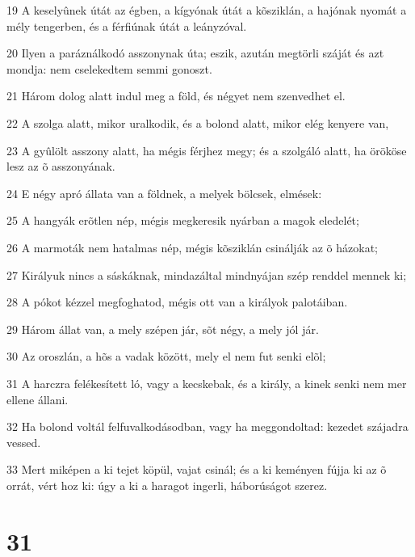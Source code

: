 \par 19 A keselyûnek útát az égben, a kígyónak útát a kõsziklán, a hajónak nyomát a mély tengerben, és a férfiúnak útát a leányzóval.
\par 20 Ilyen a paráználkodó asszonynak úta; eszik, azután megtörli száját és azt mondja: nem cselekedtem semmi gonoszt.
\par 21 Három dolog alatt indul meg a föld, és négyet nem szenvedhet el.
\par 22 A szolga alatt, mikor uralkodik, és a bolond alatt, mikor elég kenyere van,
\par 23 A gyûlölt asszony alatt, ha mégis férjhez megy; és a szolgáló alatt, ha örököse lesz az õ asszonyának.
\par 24 E négy apró állata van a földnek, a melyek bölcsek, elmések:
\par 25 A hangyák erõtlen nép, mégis megkeresik nyárban a magok eledelét;
\par 26 A marmoták nem hatalmas nép, mégis kõsziklán csinálják az õ házokat;
\par 27 Királyuk nincs a sáskáknak, mindazáltal mindnyájan szép renddel mennek ki;
\par 28 A pókot kézzel megfoghatod, mégis ott van a királyok palotáiban.
\par 29 Három állat van, a mely szépen jár, sõt négy, a mely jól jár.
\par 30 Az oroszlán, a hõs a vadak között, mely el nem fut senki elõl;
\par 31 A harczra felékesített ló, vagy a kecskebak, és a király, a kinek senki nem mer ellene állani.
\par 32 Ha bolond voltál felfuvalkodásodban, vagy ha meggondoltad: kezedet szájadra vessed.
\par 33 Mert miképen a ki tejet köpül, vajat csinál; és a ki keményen fújja ki az õ orrát, vért hoz ki: úgy a ki a haragot ingerli, háborúságot szerez.

\chapter{31}


